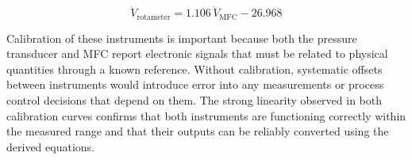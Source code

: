 \begin{equation}
    \dot{V}_{\text{rotameter}} = 1.106\, \dot{V}_{\text{MFC}} - 26.968
\end{equation}

Calibration of these instruments is important because both the pressure transducer and MFC report electronic signals that must be related to physical quantities through a known reference. Without calibration, systematic offsets between instruments would introduce error into any measurements or process control decisions that depend on them. The strong linearity observed in both calibration curves confirms that both instruments 
are functioning correctly within the measured range and that their outputs can be reliably converted using the derived equations.
